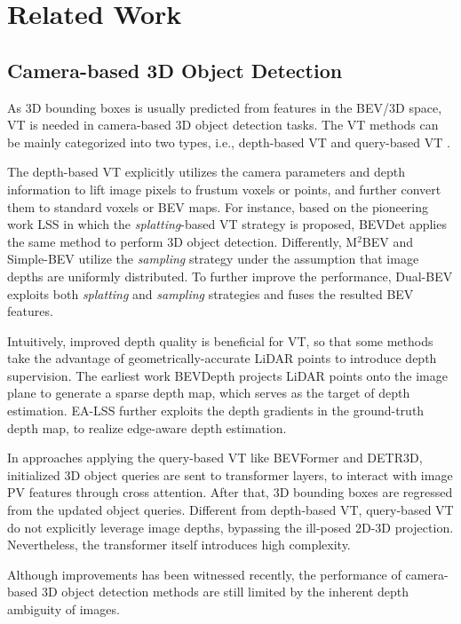 \section{Related Work}
\label{related work}
\subsection{Camera-based 3D Object Detection}
As 3D bounding boxes is usually predicted from features in the BEV/3D space, VT is needed in camera-based 3D object detection tasks. The VT methods can be mainly categorized into two types, i.e., depth-based VT \cite{BEVDepth,Simple-BEV,BEVDet,Dual-BEV,BEVSpread} and query-based VT \cite{BEVFormer,DETR3D,PETRv2}.

The depth-based VT explicitly utilizes the camera parameters and depth information to lift image pixels to frustum voxels or points, and further convert them to standard voxels or BEV maps. For instance, based on the pioneering work LSS\cite{LSS} in which the \textit{splatting}-based VT strategy is proposed, BEVDet\cite{BEVDet} applies the same method to perform 3D object detection. Differently, M$^2$BEV\cite{M2BEV} and Simple-BEV\cite{Simple-BEV} utilize the \textit{sampling} strategy under the assumption that image depths are uniformly distributed. To further improve the performance, Dual-BEV\cite{Dual-BEV} exploits both \textit{splatting} and \textit{sampling} strategies and fuses the resulted BEV features.

Intuitively, improved depth quality is beneficial for VT, so that some methods take the advantage of geometrically-accurate LiDAR points to introduce depth supervision. The earliest work BEVDepth\cite{BEVDepth} projects LiDAR points onto the image plane to generate a sparse depth map, which serves as the target of depth estimation. EA-LSS\cite{EA-LSS} further exploits the depth gradients in the ground-truth depth map, to realize edge-aware depth estimation.

In approaches applying the query-based VT like BEVFormer\cite{BEVFormer} and DETR3D\cite{DETR3D}, initialized 3D object queries are sent to transformer layers, to interact with image PV features through cross attention. After that, 3D bounding boxes are regressed from the updated object queries. Different from depth-based VT, query-based VT do not explicitly leverage image depths, bypassing the ill-posed 2D-3D projection. Nevertheless, the transformer itself introduces high complexity.

Although improvements has been witnessed recently, the performance of camera-based 3D object detection methods are still limited by the inherent depth ambiguity of images. 

